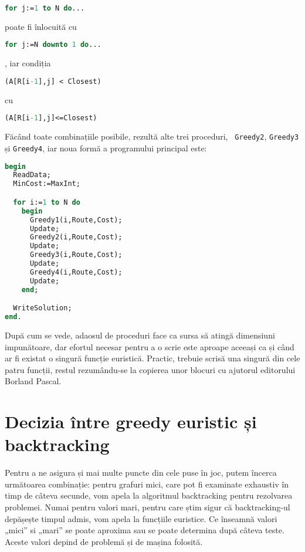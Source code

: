 \begin{lstlisting}[language=Pascal]
for j:=1 to N do...
\end{lstlisting}

poate fi înlocuită cu

\begin{lstlisting}[language=Pascal]
for j:=N downto 1 do...
\end{lstlisting}

, iar condiția

\begin{lstlisting}[language=Pascal]
(A[R[i-1],j] < Closest)
\end{lstlisting}

cu

\begin{lstlisting}[language=Pascal]
(A[R[i-1],j]<=Closest)
\end{lstlisting}

Făcând toate combinațiile posibile, rezultă alte trei proceduri, {\tt
  Greedy2}, {\tt Greedy3} și {\tt Greedy4}, iar noua formă a programului
principal este:

\begin{lstlisting}[language=Pascal]
begin
  ReadData;
  MinCost:=MaxInt;

  for i:=1 to N do
    begin
      Greedy1(i,Route,Cost);
      Update;
      Greedy2(i,Route,Cost);
      Update;
      Greedy3(i,Route,Cost);
      Update;
      Greedy4(i,Route,Cost);
      Update;
    end;

  WriteSolution;
end.
\end{lstlisting}

După cum se vede, adaosul de proceduri face ca sursa să atingă dimensiuni
impunătoare, dar efortul necesar pentru a o scrie este aproape aceeași ca și
când ar fi existat o singură funcție euristică. Practic, trebuie scrisă una
singură din cele patru funcții, restul rezumându-se la copierea unor blocuri
cu ajutorul editorului Borland Pascal.

\section{Decizia între greedy euristic și backtracking}

Pentru a ne asigura și mai multe puncte din cele puse în joc, putem încerca
următoarea combinație: pentru grafuri mici, care pot fi examinate exhaustiv în
timp de câteva secunde, vom apela la algoritmul backtracking pentru rezolvarea
problemei. Numai pentru valori mari, pentru care știm sigur că backtracking-ul
depășește timpul admis, vom apela la funcțiile euristice. Ce înseamnă valori
„mici” si „mari” se poate aproxima sau se poate determina după câteva
teste. Aceste valori depind de problemă și de mașina folosită.

